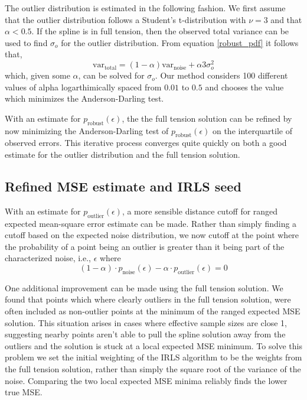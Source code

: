 \documentclass[10pt,journal]{IEEEtran}
\begin{document}
The outlier distribution is estimated in the following fashion. We first assume that the outlier distribution follows a Student's t-distribution with $\nu=3$ and that $\alpha<0.5$. If the spline is in full tension, then the observed total variance can be used to find $\sigma_o$ for the outlier distribution. From equation \ref{robust_pdf} it follows that,
\begin{equation}
    \textrm{var}_\textrm{total} = (1-\alpha) \textrm{var}_\textrm{noise} + \alpha 3 \sigma_o^2
\end{equation}
which, given some $\alpha$, can be solved for $\sigma_o$. Our method considers 100 different values of alpha logarthimically spaced from $0.01$ to $0.5$ and chooses the value which minimizes the Anderson-Darling test.

With an estimate for $p_{\textrm{robust}}(\epsilon)$, the the full tension solution can be refined by now minimizing the Anderson-Darling test of $p_{\textrm{robust}}(\epsilon)$ on the interquartile of observed errors. This iterative process converges quite quickly on both a good estimate for the outlier distribution and the full tension solution.

\subsection{Refined MSE estimate and IRLS seed}
\label{sec:refinement}

With an estimate for $p_{\textrm{outlier}}(\epsilon)$, a more sensible distance cutoff for ranged expected mean-square error estimate can be made. Rather than simply finding a cutoff based on the expected noise distribution, we now cutoff at the point where the probability of a point being an outlier is greater than it being part of the characterized noise, i.e., $\epsilon$ where
\begin{equation}
    (1-\alpha) \cdot p_{\textrm{noise}}(\epsilon) - \alpha \cdot  p_{\textrm{outlier}}(\epsilon) = 0
\end{equation}

One additional improvement can be made using the full tension solution. We found that points which where clearly outliers in the full tension solution, were often included as non-outlier points at the minimum of the ranged expected MSE solution. This situation arises in cases where effective sample sizes are close 1, suggesting nearby points aren't able to pull the spline solution away from the outliers and the solution is stuck at a local expected MSE minimum. To solve this problem we set the initial weighting of the IRLS algorithm to be the weights from the full tension solution, rather than simply the square root of the variance of the noise. Comparing the two local expected MSE minima reliably finds the lower true MSE.
\end{document}
